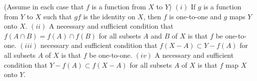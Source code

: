 \begin{exercise} (Assume in each case that $f$ is a function from $X$ to $Y$) $(i)$ If $g$ is a function from $Y$ to $X$ such that $gf$ is the identity on $X$, then $f$ is one-to-one and $g$ maps $Y$ onto $X$. $(ii)$ A necessary and sufficient condition that $f(A \cap B) = f(A) \cap f(B)$ for all subsets $A$ and $B$ of $X$ is that $f$ be one-to-one. $(iii)$ necessary and sufficient condition that $f(X - A) \subset Y - f(A)$ for all subsets $A$ of $X$ is that $f$ be one-to-one. $(iv)$ A necessary and sufficient condition that $Y - f(A) \subset f(X - A)$ for all subsets $A$ of $X$ is that $f$ map $X$ onto $Y$.
\end{exercise}